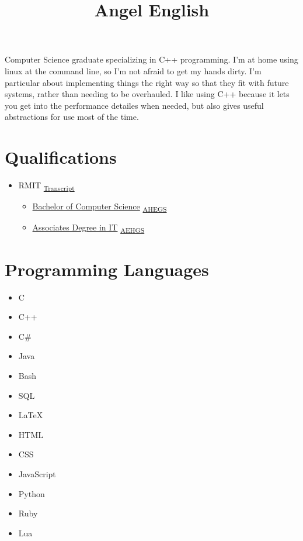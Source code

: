 \documentclass{amsart}
\title{Angel English}
\theoremstyle{definition} %
\begin{document}
\maketitle

Computer Science graduate specializing in C++ programming.
I'm at home using linux at the command line, so I'm not afraid to get
my hands dirty. I'm particular about implementing things the right
way so that they fit with future systems, rather than needing to be
overhauled. I like using C++ because it lets you get into the
performance detailes when needed, but also gives useful abstractions
for use most of the time.

\tableofcontents

\section{Qualifications}

\begin{itemize}
	\item
		RMIT
		\textsubscript{
			\href{https://www.myequals.net/sharelink/9ea57606-24b8-45e4-8030-4db56b0bee20/1c373231-4325-435c-b587-dab0f3481f64}{Transcript}
		}
		\begin{itemize}
			\item
				\href{https://www.myequals.net/sharelink/772babfa-f554-43b1-af4c-294eecf0b1df/f43434a3-e222-4b80-a4d9-2513723adb43}{Bachelor of Computer Science}
				\textsubscript{
					\href{https://www.myequals.net/sharelink/0ca660ab-7f1b-42fd-861b-e9b03df80363/0f37473b-f685-41bb-abd6-98d1e9dd7fb0}{AHEGS}
				}
			\item
				\href{https://www.myequals.net/sharelink/46bae55d-6a51-42f2-a6d3-ad1b9bab7f02/3dc307bb-09b1-43f1-b319-ee16fa643d2f}{Associates Degree in IT}
				\textsubscript{
					\href{https://www.myequals.net/sharelink/9ca4d745-4601-416f-a0fd-5c7334088e4a/49e877ab-89ee-4c36-a9d1-fd9f9911dc0a}{AEHGS}
				}
		\end{itemize}
\end{itemize}

\section{Programming Languages}

\begin{itemize}
	\item C
	\item C++
	\item C\#
	\item Java
	\item Bash
	\item SQL
	\item \LaTeX
	\item HTML
	\item CSS
	\item JavaScript
	\item Python
	\item Ruby
	\item Lua
\end{itemize}
\end{document}

